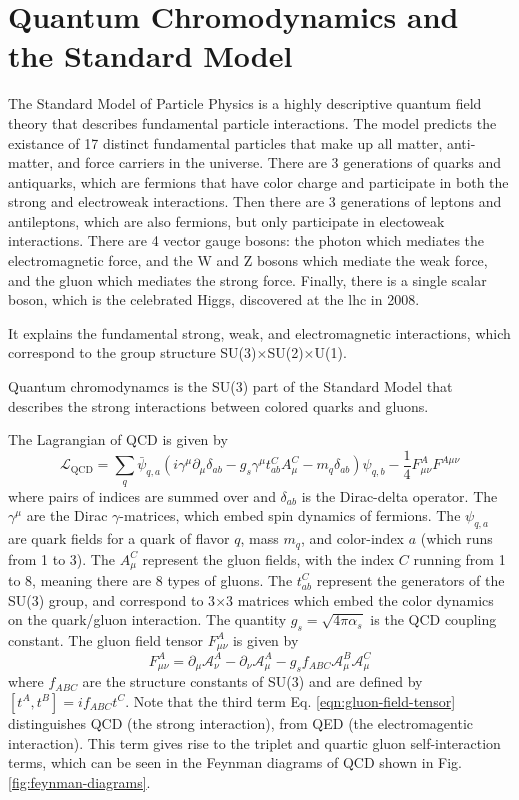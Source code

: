
\section{Quantum Chromodynamics and the Standard Model}
\label{qgp:qcd}

The Standard Model of Particle Physics is a highly descriptive quantum field theory that describes fundamental particle interactions.
The model predicts the existance of 17 distinct fundamental particles that make up all matter, anti-matter, and force carriers in the universe.
There are 3 generations of quarks and antiquarks, which are fermions that have color charge and participate in both the strong and electroweak interactions.
Then there are 3 generations of leptons and antileptons, which are also fermions, but only participate in electoweak interactions.
There are 4 vector gauge bosons: the photon which mediates the electromagnetic force, and the W and Z bosons which mediate the weak force, and the gluon which mediates the strong force.
Finally, there is a single scalar boson, which is the celebrated Higgs, discovered at the \gls{lhc} in 2008.

It explains the fundamental strong, weak, and electromagnetic interactions, which correspond to the group structure SU(3)$\times$SU(2)$\times$U(1).


Quantum chromodynamcs is the SU(3) part of the Standard Model that describes the strong interactions between colored quarks and gluons.



The Lagrangian of QCD is given by
\begin{equation}
  \mathcal{L}_{\text{QCD}} = \sum_q \bar{\psi}_{q,a} \left( i\gamma^\mu \partial_\mu \delta_{ab} - g_s \gamma^\mu t_{ab}^{C} A_{\mu}^C - m_q \delta_{ab}\right)\psi_{q,b} - \frac{1}{4}F_{\mu\nu}^{A} F^{A\mu\nu}
\end{equation}
where pairs of indices are summed over and $\delta_{ab}$ is the Dirac-delta operator.
The $\gamma^\mu$ are the Dirac $\gamma$-matrices, which embed spin dynamics of fermions.
The $\psi_{q,a}$ are quark fields for a quark of flavor $q$, mass $m_q$, and color-index $a$ (which runs from 1 to 3).
The $A_\mu^C$ represent the gluon fields, with the index $C$ running from 1 to 8, meaning there are 8 types of gluons.
The $t_{ab}^C$ represent the generators of the SU(3) group, and correspond to 3$\times$3 matrices which embed the color dynamics on the quark/gluon interaction.
The quantity $g_s = \sqrt{4\pi\alpha_s}$ is the QCD coupling constant.
The gluon field tensor $F^{A}_{\mu\nu}$ is given by
\begin{equation}
  F_{\mu\nu}^A = \partial_\mu \mathcal{A}_\nu^A - \partial_\nu \mathcal{A}_\mu^A - g_s f_{ABC} \mathcal{A}_\mu^B \mathcal{A}_\mu^C
  \label{eqn:gluon-field-tensor}
\end{equation}
where $f_{ABC}$ are the structure constants of SU(3) and are defined by $[t^A,t^B] = if_{ABC}t^C$.
Note that the third term Eq. \ref{eqn:gluon-field-tensor} distinguishes QCD (the strong interaction), from QED (the electromagentic interaction).
This term gives rise to the triplet and quartic gluon self-interaction terms, which can be seen in the Feynman diagrams of QCD shown in Fig. \ref{fig:feynman-diagrams}.

